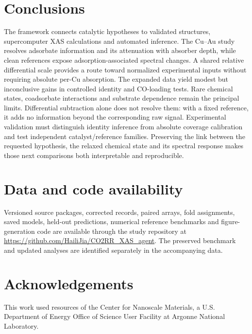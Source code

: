 \documentclass[11pt,a4paper]{article}
\begin{document}
\section{Conclusions}
The framework connects catalytic hypotheses to validated structures, supercomputer XAS calculations and automated inference. The Cu--Au study resolves adsorbate information and its attenuation with absorber depth, while clean references expose adsorption-associated spectral changes. A shared relative differential scale provides a route toward normalized experimental inputs without requiring absolute per-Cu absorption. The expanded data yield modest but inconclusive gains in controlled identity and CO-loading tests. Rare chemical states, coadsorbate interactions and substrate dependence remain the principal limits. Differential subtraction alone does not resolve them: with a fixed reference, it adds no information beyond the corresponding raw signal. Experimental validation must distinguish identity inference from absolute coverage calibration and test independent catalyst/reference families. Preserving the link between the requested hypothesis, the relaxed chemical state and its spectral response makes those next comparisons both interpretable and reproducible.

\section*{Data and code availability}
Versioned source packages, corrected records, paired arrays, fold assignments, saved models, held-out predictions, numerical reference benchmarks and figure-generation code are available through the study repository at \url{https://github.com/HailiJia/CO2RR_XAS_agent}. The preserved benchmark and updated analyses are identified separately in the accompanying data.
\section*{Acknowledgements}
This work used resources of the Center for Nanoscale Materials, a U.S. Department of Energy Office of Science User Facility at Argonne National Laboratory.
\begingroup\small\setlength{\parskip}{0pt}

\endgroup
\end{document}
